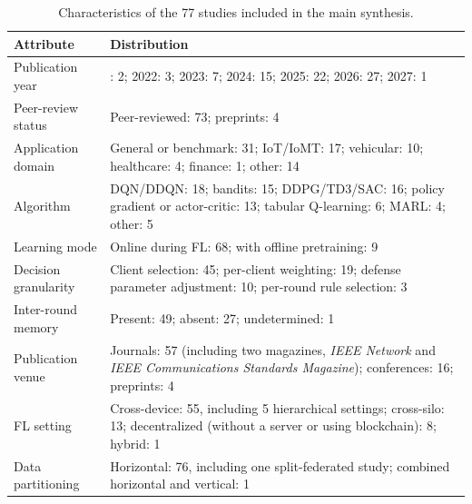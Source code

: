 \begin{table}[!ht]
  \centering
  \caption{Characteristics of the 77 studies included in the main synthesis.}
  \label{tab:corpus}
  \footnotesize
  \setlength{\tabcolsep}{3pt}
  \renewcommand{\arraystretch}{1.12}
  \begin{tabularx}{\columnwidth}{@{}
    >{\raggedright\arraybackslash}p{2.8cm}
    >{\raggedright\arraybackslash}X
    @{}}
    \toprule
    Attribute & Distribution \\
    \midrule
    Publication year & 2021: 2; 2022: 3; 2023: 7; 2024: 15; 2025: 22; 2026: 27; 2027: 1 \\

    Peer-review status
      & Peer-reviewed: 73; preprints: 4 \\

    Application domain
      & General or benchmark: 31; IoT/IoMT: 17; vehicular: 10; healthcare: 4; finance: 1; other: 14 \\

    Algorithm
      & DQN/DDQN: 18; bandits: 15; DDPG/TD3/SAC: 16; policy gradient or actor-critic: 13; tabular Q-learning: 6; MARL: 4; other: 5 \\

    Learning mode
      & Online during FL: 68; with offline pretraining: 9 \\

    Decision granularity
      & Client selection: 45; per-client weighting: 19; defense parameter adjustment: 10; per-round rule selection: 3 \\

    Inter-round memory
      & Present: 49; absent: 27; undetermined: 1 \\

    Publication venue
      & Journals: 57 (including two magazines, \emph{IEEE Network} and \emph{IEEE Communications Standards Magazine}); conferences: 16; preprints: 4 \\

    FL setting
      & Cross-device: 55, including 5 hierarchical settings; cross-silo: 13; decentralized (without a server or using blockchain): 8; hybrid: 1 \\

    Data partitioning
      & Horizontal: 76, including one split-federated study; combined horizontal and vertical: 1 \\
    \bottomrule
  \end{tabularx}
\end{table}

